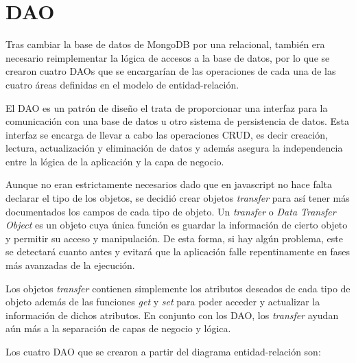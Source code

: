 \documentclass[11pt]{book}
\begin{document}
	\chapter{DAO}\label{cap:daos}
	
	Tras cambiar la base de datos de MongoDB por una relacional, también era necesario reimplementar la lógica de accesos a la base de datos, por lo que se crearon cuatro DAOs que se encargarían de las operaciones de cada una de las cuatro áreas definidas en el modelo de entidad-relación.
	
	El DAO es un patrón de diseño el trata de proporcionar una interfaz para la comunicación con una base de datos u otro sistema de persistencia de datos. Esta interfaz se encarga de llevar a cabo las operaciones CRUD, es decir creación, lectura, actualización y eliminación de datos y además asegura la independencia entre la lógica de la aplicación y la capa de negocio.
	
	Aunque no eran estrictamente necesarios dado que en javascript no hace falta declarar el tipo de los objetos, se decidió crear objetos \emph{transfer} para así tener más documentados los campos de cada tipo de objeto.
	Un \emph{transfer} o \emph{Data Transfer Object} es un objeto cuya única función es guardar la información de cierto objeto y permitir su acceso y manipulación.
	De esta forma, si hay algún problema, este se detectará cuanto antes y evitará que la aplicación falle repentinamente en fases más avanzadas de la ejecución.
	
	Los objetos \emph{transfer} contienen simplemente los atributos deseados de cada tipo de objeto además de las funciones \emph{get} y \emph{set} para poder acceder y actualizar la información de dichos atributos.
	En conjunto con los DAO, los \emph{transfer} ayudan aún más a la separación de capas de negocio y lógica.
	
	Los cuatro DAO que se crearon a partir del diagrama entidad-relación son:
	
\end{document}
